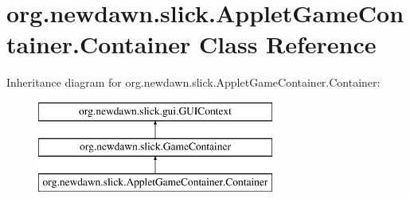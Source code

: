 \hypertarget{classorg_1_1newdawn_1_1slick_1_1_applet_game_container_1_1_container}{}\section{org.\+newdawn.\+slick.\+Applet\+Game\+Container.\+Container Class Reference}
\label{classorg_1_1newdawn_1_1slick_1_1_applet_game_container_1_1_container}
Inheritance diagram for org.\+newdawn.\+slick.\+Applet\+Game\+Container.\+Container\+:\begin{figure}[H]
\begin{center}
\leavevmode
\includegraphics[height=3.000000cm]{classorg_1_1newdawn_1_1slick_1_1_applet_game_container_1_1_container}
\end{center}
\end{figure}
